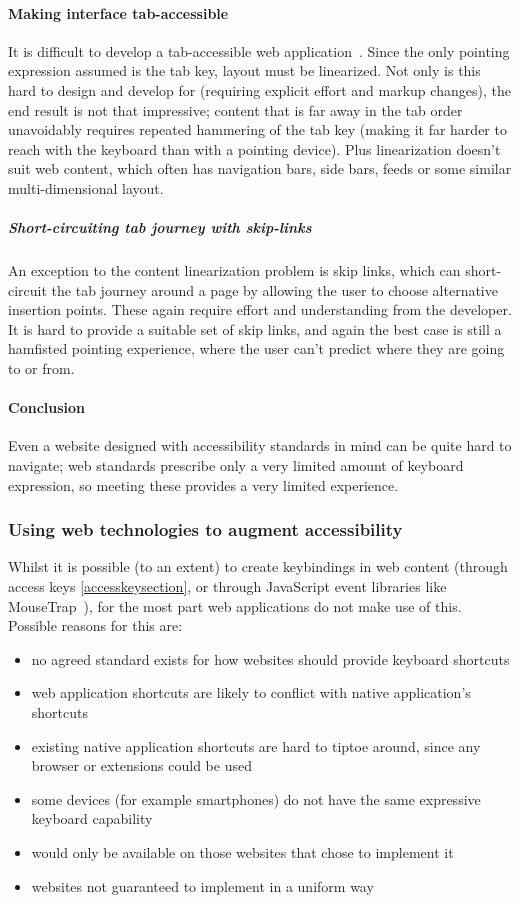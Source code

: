 \documentclass[11pt,openright,a4paper]{report}
\begin{document}
\paragraph{Making interface tab-accessible}
   It is difficult to develop a tab-accessible web application~\cite{watanabe2012using}. Since the only pointing expression assumed is the tab key, layout must be linearized. Not only is this hard to design and develop for (requiring explicit effort and markup changes), the end result is not that impressive; content that is far away in the tab order unavoidably requires repeated hammering of the tab key (making it far harder to reach with the keyboard than with a pointing device). Plus linearization doesn't suit web content, which often has navigation bars, side bars, feeds or some similar multi-dimensional layout.
\subparagraph{Short-circuiting tab journey with skip-links}
\label{sec:skiplinks}
  An exception to the content linearization problem is skip links, which can short-circuit the tab journey around a page by allowing the user to choose alternative insertion points. These again require effort and understanding from the developer. It is hard to provide a suitable set of skip links, and again the best case is still a hamfisted pointing experience, where the user can't predict where they are going to or from.
\paragraph{Conclusion}
  Even a website designed with accessibility standards in mind can be quite hard to navigate; web standards prescribe only a very limited amount of keyboard expression, so meeting these provides a very limited experience.

\subsubsection{Using web technologies to augment accessibility}
  Whilst it is possible (to an extent) to create \glspl{keybinding} in web content (through access keys \cref{accesskeysection}, or through JavaScript event libraries like MouseTrap~\cite{Mousetrap}), for the most part web applications do not make use of this. Possible reasons for this are:

\begin{itemize}
 \item no agreed standard exists for how websites should provide keyboard shortcuts
 \item web application shortcuts are likely to conflict with native application's shortcuts
 \item existing native application shortcuts are hard to tiptoe around, since any browser or extensions could be used
 \item some devices (for example smartphones) do not have the same expressive keyboard capability
 \item would only be available on those websites that chose to implement it
 \item websites not guaranteed to implement in a uniform way
\end{itemize}
\end{document}

